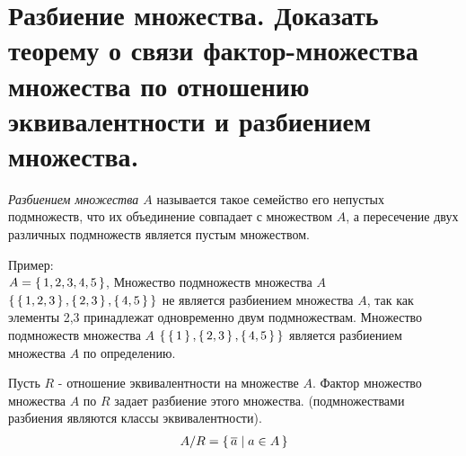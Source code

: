 \section{Разбиение множества. Доказать теорему о связи фактор-множества множества по отношению 
эквивалентности и разбиением множества.}

\begin{definition}
    \textit{Разбиением множества $A$} называется такое семейство его
    непустых подмножеств, что их объединение совпадает с множеством $A$, а
    пересечение двух различных подмножеств является пустым множеством.
\end{definition}

Пример: \\
$A = \set{1,2,3,4,5}$, Множество подмножеств множества $A$ \\
$\set{\set{1,2,3},\set{2,3},\set{4,5}}$ не является разбиением множества $A$, так как элементы
2,3 принадлежат одновременно двум подмножествам.
Множество подмножеств множества $A$ $\set{\set{1},\set{2,3},\set{4,5}}$ является разбиением
множества $A$ по определению.

\begin{theorem}
    Пусть $R$ - отношение эквивалентности на множестве $A$. Фактор
    множество множества $A$ по $R$ задает разбиение этого множества.
    (подмножествами разбиения являются классы эквивалентности).
    \begin{align*}
        A/R=\set{\overline{a} | a \in A}
    \end{align*}
\end{theorem}

